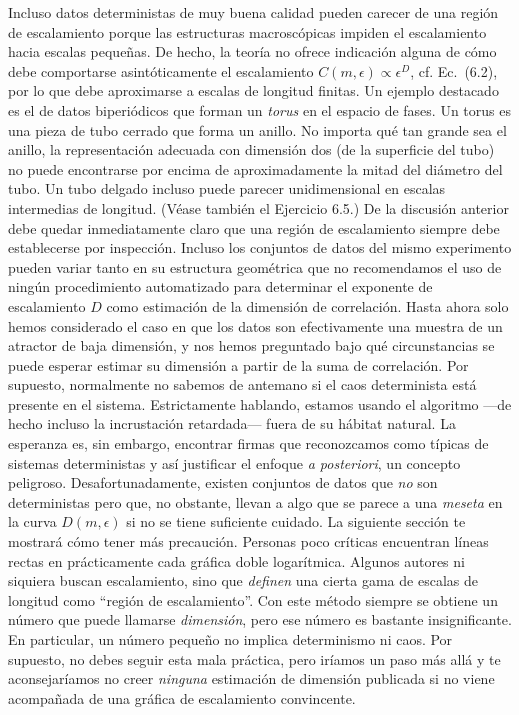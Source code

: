 \documentclass[10pt,a4paper]{book}
\begin{document}
\bigskip

Incluso datos deterministas de muy buena calidad pueden carecer de una región de escalamiento porque las estructuras macroscópicas impiden el escalamiento hacia escalas pequeñas. De hecho, la teoría no ofrece indicación alguna de cómo debe comportarse asintóticamente el escalamiento $C(m, \epsilon) \propto \epsilon^D$, cf. Ec.~(6.2), por lo que debe aproximarse a escalas de longitud finitas. Un ejemplo destacado es el de datos biperiódicos que forman un \textit{torus} en el espacio de fases. Un torus es una pieza de tubo cerrado que forma un anillo. No importa qué tan grande sea el anillo, la representación adecuada con dimensión dos (de la superficie del tubo) no puede encontrarse por encima de aproximadamente la mitad del diámetro del tubo. Un tubo delgado incluso puede parecer unidimensional en escalas intermedias de longitud. (Véase también el Ejercicio 6.5.) De la discusión anterior debe quedar inmediatamente claro que una región de escalamiento siempre debe establecerse por inspección. Incluso los conjuntos de datos del mismo experimento pueden variar tanto en su estructura geométrica que no recomendamos el uso de ningún procedimiento automatizado para determinar el exponente de escalamiento $D$ como estimación de la dimensión de correlación. Hasta ahora solo hemos considerado el caso en que los datos son efectivamente una muestra de un atractor de baja dimensión, y nos hemos preguntado bajo qué circunstancias se puede esperar estimar su dimensión a partir de la suma de correlación. Por supuesto, normalmente no sabemos de antemano si el caos determinista está presente en el sistema. Estrictamente hablando, estamos usando el algoritmo —de hecho incluso la incrustación retardada— fuera de su hábitat natural. La esperanza es, sin embargo, encontrar firmas que reconozcamos como típicas de sistemas deterministas y así justificar el enfoque \textit{a posteriori}, un concepto peligroso. Desafortunadamente, existen conjuntos de datos que \textit{no} son deterministas pero que, no obstante, llevan a algo que se parece a una \textit{meseta} en la curva $D(m, \epsilon)$ si no se tiene suficiente cuidado. La siguiente sección te mostrará cómo tener más precaución. Personas poco críticas encuentran líneas rectas en prácticamente cada gráfica doble logarítmica. Algunos autores ni siquiera buscan escalamiento, sino que \textit{definen} una cierta gama de escalas de longitud como ``región de escalamiento''. Con este método siempre se obtiene un número que puede llamarse \textit{dimensión}, pero ese número es bastante insignificante. En particular, un número pequeño no implica determinismo ni caos. Por supuesto, no debes seguir esta mala práctica, pero iríamos un paso más allá y te aconsejaríamos no creer \textit{ninguna} estimación de dimensión publicada si no viene acompañada de una gráfica de escalamiento convincente.
\end{document}
